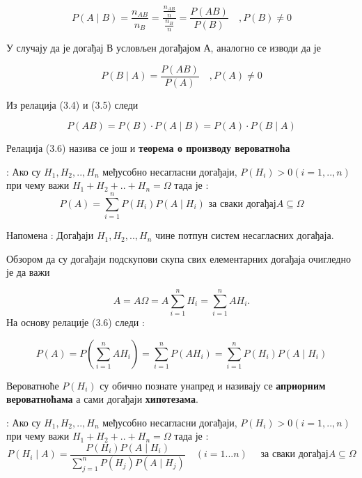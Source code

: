 \begin{equation}
 P( A \mid B ) = \frac{n_{AB}}{n_B} = \frac{\frac{n_{AB}}{n}}{\frac{n_B}{n}} = \frac{P(AB)}{P(B)} \quad ,  P(B) \neq 0
\end{equation}

У случају да је догађај В условљен догађајом А, аналогно се изводи да је 

\begin{equation}
 P( B \mid A ) = \frac{P(AB)}{P(A)} \quad ,  P(A) \neq 0
\end{equation}

Из релација (3.4) и (3.5) следи

\begin{equation}
 P( AB ) = P(B)\cdot  P( A \mid B ) = P(A)\cdot  P( B \mid A ) 
\end{equation}

Релација (3.6) назива се још и \textbf{теорема о производу вероватноћа}

\begin{te}
 : 
Ако су $H_1,H_2,..,H_n$ међусобно несагласни догађаји, $P(H_i) > 0 (i=1,..,n)$ при чему важи $H_1+H_2+..+H_n = \Omega $ тада је :
\begin{equation}
	 P(A) = \sum_{i=1}^n P(H_i)P(A \mid H_i)  \textrm{ за сваки догађај}  A \subseteq  \Omega 
\end{equation}
\end{te}
Напомена : Догађаји $H_1,H_2,..,H_n$ чине потпун систем несагласних догађаја.

\begin{dok}
Обзором да су догађаји подскупови скупа свих елементарних догађаја очигледно је да важи

\begin{equation}
A = A\Omega = A \sum_{i=1}^n H_i = \sum_{i=1}^n AH_i. 
\end{equation}
На основу релације (3.6) следи :

\begin{equation}
P(A) = P(\sum_{i=1}^n AH_i) = \sum_{i=1}^n P(AH_i) = \sum_{i=1}^n P(H_i)P(A \mid H_i)
\end{equation}
\end{dok}

Вероватноће $P(H_i)$ су обично познате унапред и називају се \textbf{априорним вероватноћама} а сами догађаји \textbf{хипотезама}. 

\begin{te}
 : 
Ако су $H_1,H_2,..,H_n$ међусобно несагласни догађаји, $P(H_i) > 0        (i=1,..,n)$ при чему важи $H_1+H_2+..+H_n = \Omega $ тада је :
\begin{equation}
	 P(H_i \mid A ) = \frac{P(H_i)P(A \mid H_i)}{ \sum_{j=1}^n P(H_j)P(A \mid H_j)}  \quad   (i=1...n)  \quad  \textrm{ за сваки догађај}  A \subseteq  \Omega 
\end{equation}
\end{te}

